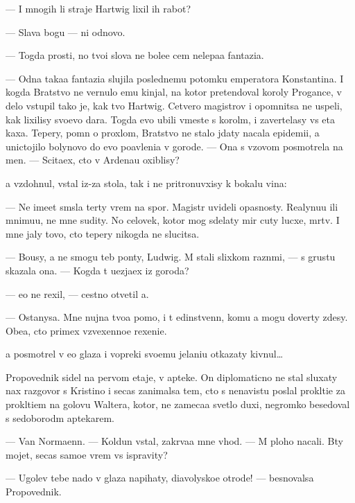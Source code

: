 \documentclass[10pt]{book}
\begin{document}
— I mnogih li straje{\y} Hartwig lixil ih rabot{\yi}?

— Slava bogu — ni odnovo.

— Togda prosti, no tvo{\y}i slova ne bole{\y}e cem nelepa{\y}a fantazi{\y}a.

— Odna taka{\y}a fantazi{\y}a slujila poslednemu potomku emperatora Konstantina. I kogda Bratstvo ne vernulo {\y}emu kinjal, na kotor{\yi}{\y} pretendoval koroly Progance, v delo vstupil tako{\y} je, kak tvo{\y} Hartwig. Cetvero magistrov i opomnitsa ne uspeli, kak lixilisy svo{\y}evo dara. Togda {\y}evo ubili vmeste s korol{\e}m, i zavertelasy vs{\ia} eta kaxa. Tepery, pomn{\ia} o proxlom, Bratstvo ne stalo jdaty nacala epidemi{\y}i, a unictojilo bolynovo do {\y}evo po{\y}avleni{\y}a v gorode. — Ona s v{\yi}zovom posmotrela na men{\ia}. — Scita{\y}ex, cto v Ardenau oxiblisy?

{\Y}a vzdohnul, vstal iz-za stola, tak i ne pritronuvxisy k bokalu vina:

— Ne ime{\y}et sm{\yi}sla ter{\ia}ty vrem{\ia} na spor{\yi}. Magistr{\yi} uvideli opasnosty. Realy\-nu\-{\y}u ili mnimu{\y}u, ne mne sudity. No celovek, kotor{\yi}{\y} mog sdelaty mir cuty lucxe, m{\e}rtv. I mne jaly tovo, cto tepery nikogda ne slucitsa.

— Bo{\y}usy, {\y}a ne smogu teb{\ia} pon{\ia}ty, Ludwig. M{\yi} stali slixkom razn{\yi}mi, — s grust{\y}u skazala ona. — Kogda t{\yi} u{\y}ezja{\y}ex iz go\-ro\-da?

— {\Y}e{\x}o ne rexil, — cestno otvetil {\y}a.

— Ostanysa. Mne nujna tvo{\y}a pomo{\x}, i t{\yi} {\y}edinstvenn{\yi}{\y}, komu {\y}a mogu dove\-r{\ia}ty zdesy. Obe{\x}a{\y}, cto primex vzvexenno{\y}e rexeni{\y}e.

{\Y}a posmotrel v {\y}e{\y}o glaza i vopreki svo{\y}emu jelani{\y}u otkazaty kivnul…

Pro\-po\-ved\-nik sidel na pervom etaje, v apteke. On diplomaticno ne stal sluxaty nax razgovor s Kristino{\y} i se{\y}cas zanimalsa tem, cto s nenavist{\y}u pos{\yi}lal prokl{\ia}ti{\y}e za prokl{\ia}ti{\y}em na golovu Waltera, kotor{\yi}{\y}, ne zameca{\y}a svetlo{\y} duxi, negromko besedoval s sedoborod{\yi}m aptekarem.

— Van Normaenn. — Koldun vstal, zakr{\yi}va{\y}a mne v{\yi}hod. — M{\yi} ploho nacali. B{\yi}ty mojet, se{\y}cas samo{\y}e vrem{\ia} vs{\e} ispravity?

— Ugol{\y}ev tebe nado v glaza napihaty, diavolysko{\y}e otrod{\y}e! — besnovalsa Pro\-po\-ved\-nik.
\end{document}
